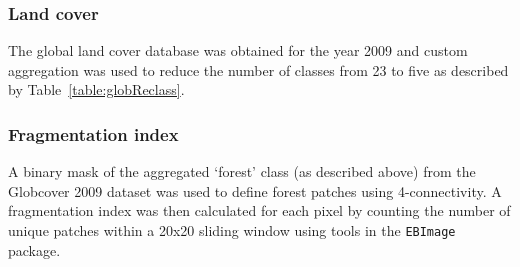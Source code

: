 \documentclass[9pt,twoside,lineno]{pnas-new}
\begin{document}
\subsubsection*{Land cover}
The global land cover database \cite{Olivier2012Global2009} was obtained for the year 2009 and custom aggregation was used to reduce the number of classes from 23 to five as described by Table~\ref{table:globReclass}.\par
\subsubsection*{Fragmentation index}
A binary mask of the aggregated `forest' class (as described above) from the Globcover 2009 dataset \cite{Olivier2012Global2009} was used to define forest patches using 4-connectivity. A fragmentation index was then calculated for each pixel by counting the number of unique patches within a 20x20 sliding window using tools in the \texttt{EBImage} package. \par
\end{document}
